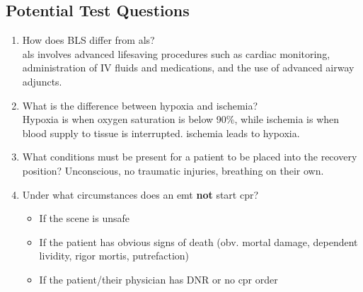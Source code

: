 \documentclass[../../EMT-169.tex]{subfiles}
\begin{document}
\subsection{Potential Test Questions}
\begin{enumerate}
	\item How does BLS differ from \acrshort{als}? \hfill \\
	\acrshort{als} involves advanced lifesaving procedures such as cardiac monitoring, administration of  IV fluids and medications, and the use of advanced airway adjuncts.
	\item What is the difference between hypoxia and ischemia? \hfill \\
	Hypoxia is when oxygen saturation is below 90\%, while ischemia is when blood supply to tissue is interrupted. \newline
	ischemia leads to hypoxia.
	\item What conditions must be present for a patient to be placed into the recovery position? 
	Unconscious, no traumatic injuries, breathing on their own.\hfill \\
	\item Under what circumstances does an \acrshort{emt} \textbf{not} start \acrshort{cpr}?
	\begin{itemize}
		\item If the scene is unsafe
		\item If the patient has obvious signs of death (obv. mortal damage, dependent lividity, rigor mortis, putrefaction)
		\item If the patient/their physician has DNR or no \acrshort{cpr} order
	\end{itemize}\hfill \\
\end{enumerate}
\end{document}
